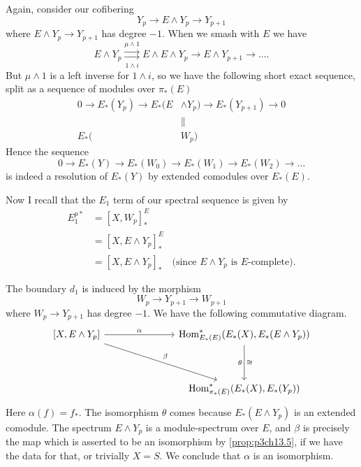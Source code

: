 \documentclass[../main]{subfiles}
\begin{document}
Again, consider our cofibering
\[Y_p\longrightarrow E\wedge Y_p\longrightarrow Y_{p+1}\]
where $E\wedge Y_p\longrightarrow Y_{p+1}$ has degree $-1$. When we smash with $E$ we have 
\[E\wedge Y_p \overset{\mu\wedge 1}{\underset{1\wedge i}{\rightrightarrows}} E\wedge E\wedge Y_p \longrightarrow E\wedge Y_{p+1}\longrightarrow \hdots.\]
But $\mu\wedge 1$ is a left inverse for $1\wedge i$, so we have the following short exact sequence, split as a sequence of modules over $\pi_\ast(E)$
\begin{align} 0\longrightarrow E_\ast(Y_p) \longrightarrow E_\ast(E&\wedge Y_p)\longrightarrow E_\ast(Y_{p+1}) \longrightarrow 0 \nonumber \\ 
&\| \nonumber\\
E_\ast(&W_p) \nonumber
\end{align}
Hence the sequence
\[0\longrightarrow E_\ast(Y)\longrightarrow E_\ast(W_0) \longrightarrow E_\ast(W_1) \longrightarrow E_\ast(W_2) \longrightarrow \hdots\]
is indeed a resolution of $E_\ast(Y)$ by extended comodules over $E_\ast(E)$.

Now I recall that the $E_1$ term of our spectral sequence is given by 
\begin{align}
    E_1^{p\ast} &= [X,W_p]_\ast^E \nonumber \\
    &= [X, E\wedge Y_p]_\ast^E \nonumber \\
    &=[X,E\wedge Y_p]_\ast \quad \text{(since } E\wedge Y_p \text{ is } E\text{-complete).} \nonumber
\end{align}

The boundary $d_1$ is induced by the morphism
\[W_p\longrightarrow Y_{p+1}\longrightarrow W_{p+1}\]
where $W_p\longrightarrow Y_{p+1}$ has degree $-1$. We have the following commutative diagram.
\[
\begin{tikzcd}
{[X,E\wedge Y_p]} &&& {\operatorname{Hom}_{E_\ast(E)}^\ast (E_\ast(X), E_\ast(E\wedge Y_p))}\arrow[swap]{dd}{\theta}[swap]{\cong} \\
\\
&&& {\operatorname{Hom}_{\pi_\ast(E)}^\ast(E_\ast(X),E_\ast(Y_p))}
\arrow["\alpha", from=1-1, to=1-4]
\arrow["\beta", from=1-1, to=3-4]
\end{tikzcd}
\]
Here $\alpha(f)=f_\ast$. The isomorphism $\theta$ comes because $E_\ast(E\wedge Y_p)$ is an extended comodule. The spectrum $E\wedge Y_p$ is a module-spectrum over $E$, and $\beta$ is precisely the map which is asserted to be an isomorphism by \ref{prop:p3ch13.5}, if we have the data for that, or trivially $X=S$. We conclude that $\alpha$ is an isomorphism.
\end{document}
